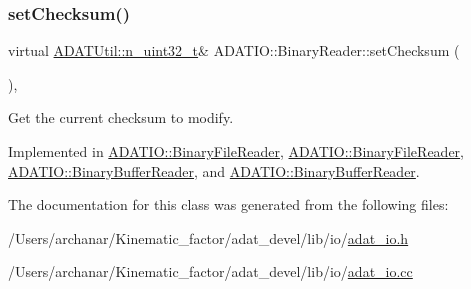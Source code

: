 \subsubsection{\texorpdfstring{setChecksum()}{setChecksum()}\hspace{0.1cm}{\footnotesize\ttfamily [2/2]}}
{\footnotesize\ttfamily virtual \mbox{\hyperlink{namespaceADATUtil_ad945a8afa4db2d1f89b731964adae97e}{A\+D\+A\+T\+Util\+::n\+\_\+uint32\+\_\+t}}\& A\+D\+A\+T\+I\+O\+::\+Binary\+Reader\+::set\+Checksum (\begin{DoxyParamCaption}{ }\end{DoxyParamCaption})\hspace{0.3cm}{\ttfamily [protected]}, {}}



Get the current checksum to modify. 



Implemented in \mbox{\hyperlink{classADATIO_1_1BinaryFileReader_a9279d31577b7fffa174df067c72ebcc4}{A\+D\+A\+T\+I\+O\+::\+Binary\+File\+Reader}}, \mbox{\hyperlink{classADATIO_1_1BinaryFileReader_a9279d31577b7fffa174df067c72ebcc4}{A\+D\+A\+T\+I\+O\+::\+Binary\+File\+Reader}}, \mbox{\hyperlink{classADATIO_1_1BinaryBufferReader_a3976e5ece3392d04158307f864a84bb7}{A\+D\+A\+T\+I\+O\+::\+Binary\+Buffer\+Reader}}, and \mbox{\hyperlink{classADATIO_1_1BinaryBufferReader_a3976e5ece3392d04158307f864a84bb7}{A\+D\+A\+T\+I\+O\+::\+Binary\+Buffer\+Reader}}.



The documentation for this class was generated from the following files\+:\begin{DoxyCompactItemize}
\item 
/\+Users/archanar/\+Kinematic\+\_\+factor/adat\+\_\+devel/lib/io/\mbox{\hyperlink{lib_2io_2adat__io_8h}{adat\+\_\+io.\+h}}\item 
/\+Users/archanar/\+Kinematic\+\_\+factor/adat\+\_\+devel/lib/io/\mbox{\hyperlink{adat__io_8cc}{adat\+\_\+io.\+cc}}\end{DoxyCompactItemize}
